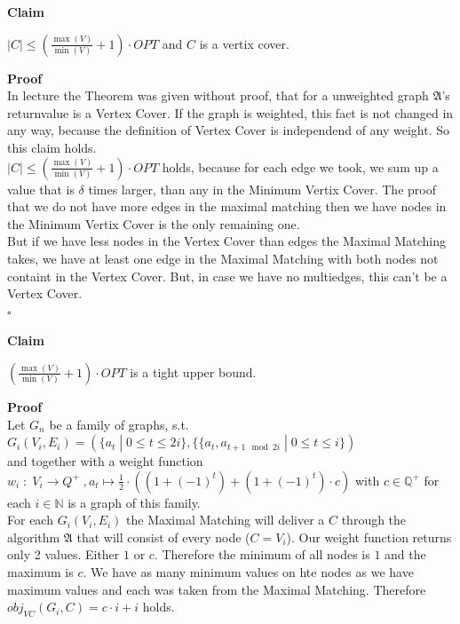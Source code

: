 \documentclass[11pt,a4paper,ngerman]{article}
\newcommand{\claim}{\addtocounter{claims}{1} \bfseries Claim \arabic{claims}}
\newcommand{\proof}{\bfseries Proof}
\begin{document}
\begin{description}
\item{\claim} $|C| \leq \left( \frac{\max (V)}{\min (V)} + 1 \right) \cdot OPT$ and $C$ is a vertix cover. 
\item{\proof}\\
In lecture the Theorem was given without proof, that for a unweighted graph $\mathfrak{A}$'s returnvalue is a Vertex Cover. If the graph is weighted, this fact is not changed in any way, because the definition of Vertex Cover is independend of any weight. So this claim holds.\\

$|C| \leq \left( \frac{\max (V)}{\min (V)} + 1 \right) \cdot OPT$ holds, because for each edge we took, we sum up a value that is $\delta$ times larger, than any in the Minimum Vertix Cover. The proof that we do not have more edges in the maximal matching then we have nodes in the Minimum Vertix Cover is the only remaining one.\\
But if we have less nodes in the Vertex Cover than edges the Maximal Matching takes, we have at least one edge in the Maximal Matching with both nodes not containt in the Vertex Cover. But, in case we have no multiedges, this can't be a Vertex Cover.\\
\mbox{}\hfill $\square$

\pagebreak

\item{\claim} $ \left( \frac{\max (V)}{\min (V)} + 1 \right) \cdot OPT$ is a tight upper bound.
\item{\proof} \\Let $G_n$ be a family of graphs, s.t. \\$G_i(V_i,E_i) = (\{a_t \; | \; 0 \leq t \leq 2i \}, \{ \{a_t, a_{t+1 \mod 2i} \; | \; 0 \leq t \leq i \})$ \\and together with a weight function \\$w_i \; : \; V_i \rightarrow Q^+ \; , a_t \mapsto \frac{1}{2} \cdot \left( (1+(-1)^t) + (1+(-1)^t) \cdot c \right)$ with $c \in \mathbb{Q}^+$ for each $i \in \mathbb{N}$ is a graph of this family.\\

For each $G_i(V_i,E_i)$ the Maximal Matching will deliver a $C$ through the algorithm $\mathfrak{A}$ that will consist of every node ($C=V_i$). Our weight function returns only 2 values. Either $1$ or $c$. Therefore the minimum of all nodes is $1$ and the maximum is $c$. We have as many minimum values on hte nodes as we have maximum values and each was taken from the Maximal Matching. Therefore $obj_{VC} (G_i, C) = c\cdot i + i$ holds.\\


\end{description}
\end{document}
